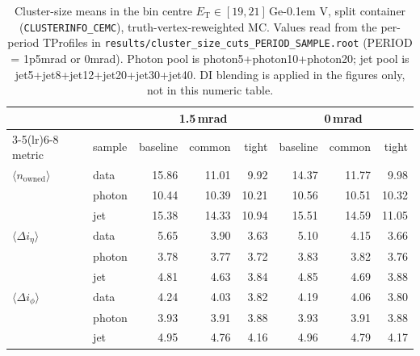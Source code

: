 \documentclass[11pt,a4paper]{article}
\newcommand{\ET}{\ensuremath{E_{\text{T}}}\xspace}
\newcommand{\GeV}{\ifmmode {\mathrm{\ Ge\kern -0.1em V}}\else\textrm{Ge\kern -0.1em V}\fi\xspace}
\newcommand{\nown}{\ensuremath{n_{\mathrm{owned}}}\xspace}
\newcommand{\dietag}{\ensuremath{\Delta i_\eta}\xspace}
\newcommand{\diphig}{\ensuremath{\Delta i_\phi}\xspace}
\newcommand{\splitnode}{\texttt{CLUSTERINFO\_CEMC}\xspace}
\begin{document}
\begin{table}[H]
\centering\small
\begin{tabular}{llrrrrrr}
\toprule
 & & \multicolumn{3}{c}{1.5\,mrad} & \multicolumn{3}{c}{0\,mrad}\\
\cmidrule(lr){3-5}\cmidrule(lr){6-8}
metric & sample & baseline & common & tight & baseline & common & tight \\
\midrule
$\langle\nown\rangle$   & data   & 15.86 & 11.01 & 9.92 & 14.37 & 11.77 & 9.98 \\
                         & photon & 10.44 & 10.39 & 10.21 & 10.56 & 10.51 & 10.32 \\
                         & jet    & 15.38 & 14.33 & 10.94 & 15.51 & 14.59 & 11.05 \\
\midrule
$\langle\dietag\rangle$  & data   &  5.65 &  3.90 & 3.63 &  5.10 &  4.15 & 3.66 \\
                         & photon &  3.78 &  3.77 & 3.72 &  3.83 &  3.82 & 3.76 \\
                         & jet    &  4.81 &  4.63 & 3.84 &  4.85 &  4.69 & 3.88 \\
\midrule
$\langle\diphig\rangle$  & data   &  4.24 &  4.03 & 3.82 &  4.19 &  4.06 & 3.80 \\
                         & photon &  3.93 &  3.91 & 3.88 &  3.93 &  3.91 & 3.88 \\
                         & jet    &  4.95 &  4.76 & 4.16 &  4.96 &  4.79 & 4.17 \\
\bottomrule
\end{tabular}
\caption{Cluster-size means in the bin centre
  $\ET\in[19,21]$\,\GeV, split container (\splitnode),
  truth-vertex-reweighted MC. Values read from the per-period
  TProfiles in
  \texttt{results/cluster\_size\_cuts\_PERIOD\_SAMPLE.root}
  (PERIOD = 1p5mrad or 0mrad). Photon pool is
  photon5+photon10+photon20; jet pool is
  jet5+jet8+jet12+jet20+jet30+jet40. DI blending is applied in the
  figures only, not in this numeric table.}
\label{tab:cluster_numbers}
\end{table}
\end{document}

